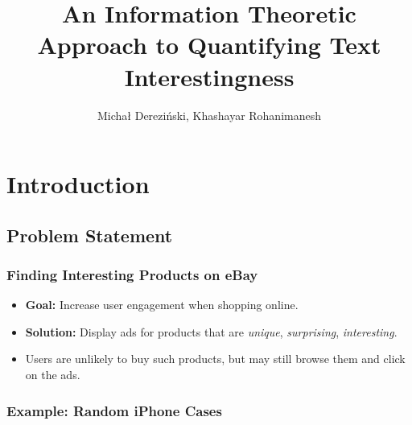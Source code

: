 \documentclass{beamer}
\title[Quantifying Text Interestingness]{An Information Theoretic
    Approach to Quantifying Text Interestingness}
\author{Michał Dereziński, Khashayar Rohanimanesh}
\begin{document}
\begin{frame}
  \titlepage
\end{frame}

\linespread{1.3}

\section{Introduction}
\subsection{Problem Statement}
\begin{frame}
\frametitle{Finding Interesting Products on eBay}
\begin{itemize}
\item {\bf Goal:} Increase user engagement when shopping online.
\item {\bf Solution:} Display ads for products that are {\em unique},
  {\em surprising}, {\em interesting}. 
\item Users are unlikely to buy such products, but may still browse
  them and click on the ads. 
\end{itemize}
\end{frame}

\begin{frame}
\frametitle{Example: Random iPhone Cases}
\begin{figure}
\centering
{}
\label{fig:boring}
\end{figure}
\end{frame}
\end{document}
